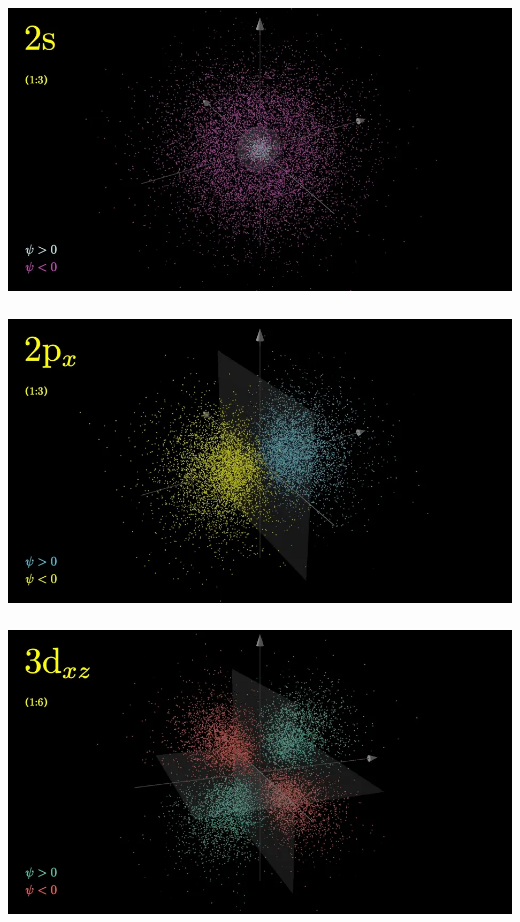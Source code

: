 \begin{frame}
	\frametitle{}
  \begin{center}
	   \includegraphics[width=1\textwidth]{figs/2022-03-30-18-46-37.png}
  \end{center}
\end{frame}

\begin{frame}
	\frametitle{}
  \begin{center}
	   \includegraphics[width=1\textwidth]{figs/2022-03-30-18-48-34.png}
  \end{center}
\end{frame}

\begin{frame}
	\frametitle{}
  \begin{center}
	   \includegraphics[width=1\textwidth]{figs/2022-03-30-18-49-45.png}
  \end{center}
\end{frame}

